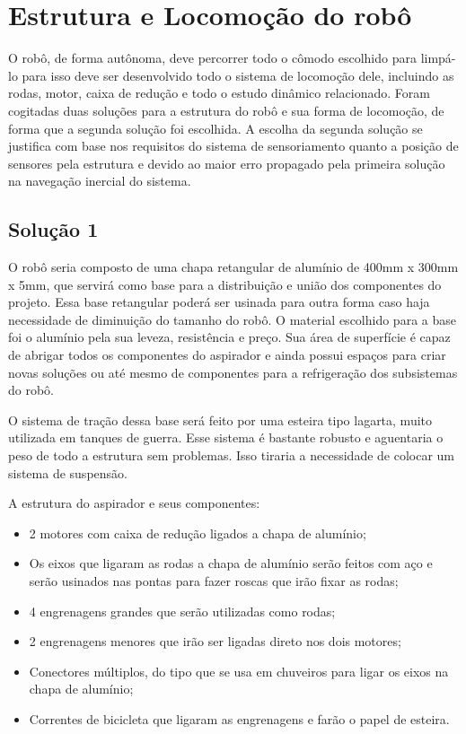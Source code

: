 \section{Estrutura e Locomoção do robô} %
\label{sub:alimentação}
	
	O robô, de forma autônoma, deve percorrer todo o cômodo escolhido para limpá-lo para isso deve ser desenvolvido todo o sistema de locomoção dele, incluindo as rodas, motor, caixa de redução e todo o estudo dinâmico relacionado. Foram cogitadas duas soluções para a estrutura do robô e sua forma de locomoção, de forma que a segunda solução foi escolhida. A escolha da segunda solução se justifica com base nos requisitos do sistema de sensoriamento quanto a posição de sensores pela estrutura e devido ao maior erro propagado pela primeira solução na navegação inercial do sistema. 

	\subsection{Solução 1} %
	\label{sub:solução_1}

		O robô seria composto de uma chapa retangular de alumínio de 400mm x 300mm x 5mm, que servirá como base para a distribuição e união dos componentes do projeto. Essa base retangular poderá ser usinada para outra forma caso haja necessidade de diminuição do tamanho do robô. O material escolhido para a base foi o alumínio pela sua leveza, resistência e preço. Sua área  de superfície é capaz de abrigar todos os componentes do aspirador e ainda possui espaços para criar novas soluções ou até mesmo de componentes para a refrigeração dos subsistemas do robô.

		O sistema de tração dessa base será feito por uma esteira tipo lagarta, muito utilizada em tanques de guerra. Esse sistema é bastante robusto e aguentaria o peso de todo a estrutura sem problemas. Isso tiraria a necessidade de colocar um sistema de suspensão.

		A estrutura do aspirador e seus componentes:

		\begin{itemize}
			\item 2 motores com caixa de redução ligados a chapa de alumínio;
			\item Os eixos que ligaram as rodas a chapa de alumínio serão feitos com aço e serão usinados nas pontas para fazer roscas que irão fixar as rodas;
			\item 4 engrenagens grandes que serão utilizadas como rodas;
			\item 2 engrenagens menores que irão ser ligadas direto nos dois motores;
			\item Conectores múltiplos, do tipo que se usa em chuveiros para ligar os eixos na chapa de alumínio;
			\item Correntes de bicicleta que ligaram as engrenagens e farão o papel de esteira.
		\end{itemize}

